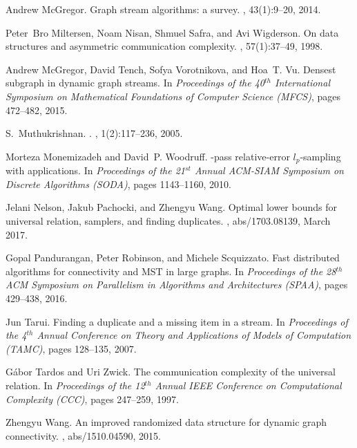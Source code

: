 \documentclass[11pt]{article}
\begin{document}
\begin{thebibliography}{GMWW14}
Andrew McGregor.
\newblock Graph stream algorithms: a survey.
, 43(1):9--20, 2014.

Peter~Bro Miltersen, Noam Nisan, Shmuel Safra, and Avi Wigderson.
\newblock On data structures and asymmetric communication complexity.
, 57(1):37--49, 1998.

Andrew McGregor, David Tench, Sofya Vorotnikova, and Hoa~T. Vu.
\newblock Densest subgraph in dynamic graph streams.
\newblock In {\em Proceedings of the 40$^{th}$ International Symposium on
  Mathematical Foundations of Computer Science (MFCS)}, pages 472--482, 2015.

S.~Muthukrishnan.
.
,
  1(2):117--236, 2005.

Morteza Monemizadeh and David~P. Woodruff.
-pass relative-error $l_p$-sampling with applications.
\newblock In {\em Proceedings of the 21$^{st}$ Annual {ACM-SIAM} Symposium on
  Discrete Algorithms (SODA)}, pages 1143--1160, 2010.

Jelani Nelson, Jakub Pachocki, and Zhengyu Wang.
\newblock Optimal lower bounds for universal relation, samplers, and finding
  duplicates.
, abs/1703.08139, March 2017.

Gopal Pandurangan, Peter Robinson, and Michele Scquizzato.
\newblock Fast distributed algorithms for connectivity and {MST} in large
  graphs.
\newblock In {\em Proceedings of the 28$^{th}$ {ACM} Symposium on Parallelism
  in Algorithms and Architectures (SPAA)}, pages 429--438, 2016.

Jun Tarui.
\newblock Finding a duplicate and a missing item in a stream.
\newblock In {\em Proceedings of the 4$^{th}$ Annual Conference on Theory and
  Applications of Models of Computation (TAMC)}, pages 128--135, 2007.

G{\'{a}}bor Tardos and Uri Zwick.
\newblock The communication complexity of the universal relation.
\newblock In {\em Proceedings of the 12$^{th}$ Annual {IEEE} Conference on
  Computational Complexity (CCC)}, pages 247--259, 1997.

Zhengyu Wang.
\newblock An improved randomized data structure for dynamic graph connectivity.
, abs/1510.04590, 2015.

\end{thebibliography}
\end{document}
